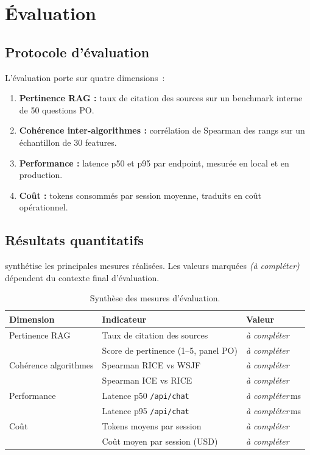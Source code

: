 \chapter{Évaluation}
\label{ch:eval}

\section{Protocole d'évaluation}
L'évaluation porte sur quatre dimensions~:
\begin{enumerate}
  \item \textbf{Pertinence RAG :} taux de citation des sources sur
        un benchmark interne de 50 questions PO.
  \item \textbf{Cohérence inter-algorithmes :} corrélation de
        Spearman des rangs sur un échantillon de 30 features.
  \item \textbf{Performance :} latence p50 et p95 par endpoint,
        mesurée en local et en production.
  \item \textbf{Coût :} tokens consommés par session moyenne,
        traduits en coût opérationnel.
\end{enumerate}

\section{Résultats quantitatifs}
 synthétise les principales mesures réalisées.
Les valeurs marquées \emph{(à compléter)} dépendent du contexte
final d'évaluation.

\begin{table}[H]\centering\small
\caption{Synthèse des mesures d'évaluation.}
\label{tab:results}
\begin{tabularx}{\linewidth}{lXl}
\toprule
\textbf{Dimension}           & \textbf{Indicateur}                       & \textbf{Valeur}\\
\midrule
Pertinence RAG               & Taux de citation des sources               & \emph{à compléter}\\
                             & Score de pertinence (1--5, panel PO)       & \emph{à compléter}\\
Cohérence algorithmes        & Spearman RICE vs WSJF                      & \emph{à compléter}\\
                             & Spearman ICE vs RICE                       & \emph{à compléter}\\
Performance                  & Latence p50 \texttt{/api/chat}             & \emph{à compléter}\,ms\\
                             & Latence p95 \texttt{/api/chat}             & \emph{à compléter}\,ms\\
Coût                         & Tokens moyens par session                  & \emph{à compléter}\\
                             & Coût moyen par session (USD)               & \emph{à compléter}\\
\bottomrule
\end{tabularx}
\end{table}

